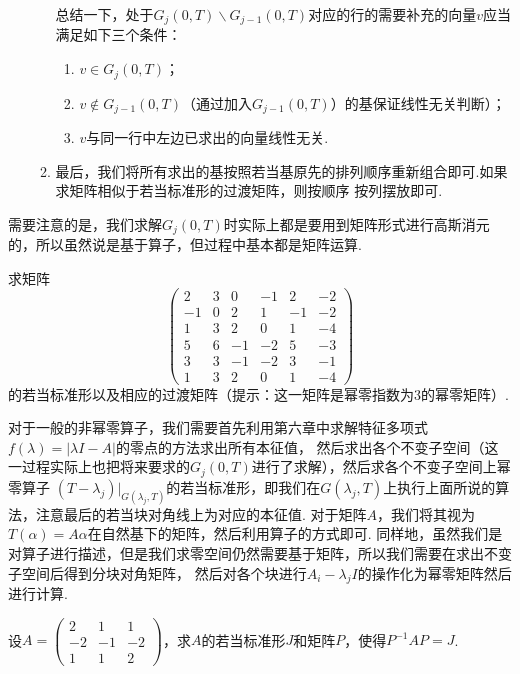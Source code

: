 \begin{enumerate}
\begin{enumerate}[label=(\arabic*)]
        总结一下，处于$G_j(0,T)\backslash G_{j-1}(0,T)$对应的行的需要补充的向量$v$应当满足如下三个条件：
        \begin{enumerate}[label=(\roman*)]
            \item $v\in G_j(0,T)$；

            \item $v\notin G_{j-1}(0,T)$（通过加入$G_{j-1}(0,T)$）的基保证线性无关判断）；

            \item $v$与同一行中左边已求出的向量线性无关.
        \end{enumerate}
        \item 最后，我们将所有求出的基按照若当基原先的排列顺序重新组合即可.如果求矩阵相似于若当标准形的过渡矩阵，则按顺序
        按列摆放即可.
    \end{enumerate}
\end{enumerate}
需要注意的是，我们求解$G_j(0,T)$时实际上都是要用到矩阵形式进行高斯消元的，所以虽然说是基于算子，但过程中基本都是矩阵运算.
\begin{example}
    求矩阵\[\begin{pmatrix}
        2 & 3 & 0 & -1 & 2 & -2 \\ -1 & 0 & 2 & 1 & -1 & -2 \\
        1 & 3 & 2 & 0  & 1 & -4 \\ 5 & 6 & -1 & -2 & 5 & -3 \\
        3 & 3 & -1 & -2 & 3 & -1 \\ 1 & 3 & 2 & 0 & 1 & -4
    \end{pmatrix}\]的若当标准形以及相应的过渡矩阵（提示：这一矩阵是幂零指数为3的幂零矩阵）.
\end{example}
对于一般的非幂零算子，我们需要首先利用第六章中求解特征多项式$f(\lambda)=|\lambda I-A|$的零点的方法求出所有本征值，
然后求出各个不变子空间（这一过程实际上也把将来要求的$G_j(0,T)$进行了求解），然后求各个不变子空间上幂零算子
$(T-\lambda_j)\vert_{G(\lambda_j,T)}$的若当标准形，即我们在$G(\lambda_j,T)$上执行上面所说的算法，注意最后的若当块对角线上为对应的本征值.
对于矩阵$A$，我们将其视为$T(\alpha)=A\alpha$在自然基下的矩阵，然后利用算子的方式即可.
同样地，虽然我们是对算子进行描述，但是我们求零空间仍然需要基于矩阵，所以我们需要在求出不变子空间后得到分块对角矩阵，
然后对各个块进行$A_i-\lambda_jI$的操作化为幂零矩阵然后进行计算.
\begin{example}
    设$A=\begin{pmatrix}
        2 & 1 & 1 \\ -2 & -1 & -2 \\ 1 & 1 & 2
    \end{pmatrix}$，求$A$的若当标准形$J$和矩阵$P$，使得$P^{-1}AP=J$.
\end{example}

